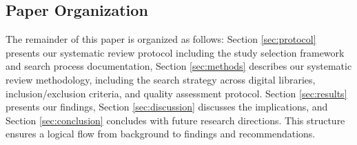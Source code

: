 \subsection{Paper Organization}
The remainder of this paper is organized as follows: Section \ref{sec:protocol} presents our systematic review protocol including the study selection framework and search process documentation, Section \ref{sec:methods} describes our systematic review methodology, including the search strategy across digital libraries, inclusion/exclusion criteria, and quality assessment protocol. Section \ref{sec:results} presents our findings, Section \ref{sec:discussion} discusses the implications, and Section \ref{sec:conclusion} concludes with future research directions. This structure ensures a logical flow from background to findings and recommendations.
